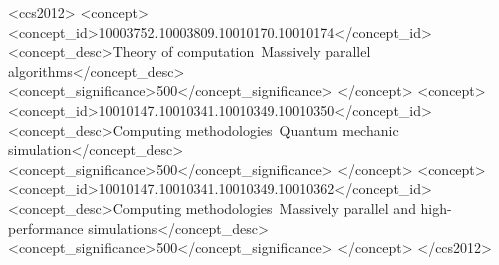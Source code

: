 \documentclass[format=sigconf,screen,authorversion]{acmart}
\begin{document}
%
%
\begin{CCSXML}
<ccs2012>
<concept>
	<concept_id>10003752.10003809.10010170.10010174</concept_id>
	<concept_desc>Theory of computation~Massively parallel algorithms</concept_desc>
	<concept_significance>500</concept_significance>
</concept>
<concept>
	<concept_id>10010147.10010341.10010349.10010350</concept_id>
	<concept_desc>Computing methodologies~Quantum mechanic simulation</concept_desc>
	<concept_significance>500</concept_significance>
</concept>
<concept>
	<concept_id>10010147.10010341.10010349.10010362</concept_id>
	<concept_desc>Computing methodologies~Massively parallel and high-performance simulations</concept_desc>
	<concept_significance>500</concept_significance>
</concept>
</ccs2012>
\end{CCSXML}





\maketitle















\balance


 


\newpage


\end{document}
